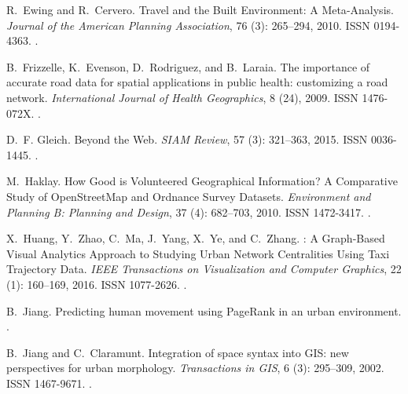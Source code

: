 \documentclass[Afour,sageh,times]{sagej}
\begin{document}
\begin{thebibliography}{54}
	R.~Ewing and R.~Cervero.
	\newblock Travel and the {Built} {Environment}: {A} {Meta}-{Analysis}.
	\newblock \emph{Journal of the American Planning Association}, 76
	(3): 265--294, 2010.
	\newblock ISSN 0194-4363.
	\newblock {}.
	
	B.~Frizzelle, K.~Evenson, D.~Rodriguez, and B.~Laraia.
	\newblock The importance of accurate road data for spatial applications in
	public health: customizing a road network.
	\newblock \emph{International Journal of Health Geographics}, 8 (24),
	2009.
	\newblock ISSN 1476-072X.
	\newblock {}.
	
	D.~F. Gleich.
	 {Beyond} the {Web}.
	\newblock \emph{SIAM Review}, 57 (3): 321--363, 2015.
	\newblock ISSN 0036-1445.
	\newblock {}.
	
	M.~Haklay.
	\newblock How {Good} is {Volunteered} {Geographical} {Information}? {A}
	{Comparative} {Study} of {OpenStreetMap} and {Ordnance} {Survey} {Datasets}.
	\newblock \emph{Environment and Planning B: Planning and Design}, 37
	(4): 682--703, 2010.
	\newblock ISSN 1472-3417.
	\newblock {}.
	
	X.~Huang, Y.~Zhao, C.~Ma, J.~Yang, X.~Ye, and C.~Zhang.
	: {A} {Graph}-{Based} {Visual} {Analytics} {Approach} to
	{Studying} {Urban} {Network} {Centralities} {Using} {Taxi} {Trajectory}
	{Data}.
	\newblock \emph{IEEE Transactions on Visualization and Computer Graphics},
	22 (1): 160--169, 2016.
	\newblock ISSN 1077-2626.
	\newblock {}.
	
	B.~Jiang.
	\newblock Predicting human movement using {PageRank} in an urban environment.
	.
	
	B.~Jiang and C.~Claramunt.
	\newblock Integration of space syntax into {GIS}: new perspectives for urban
	morphology.
	\newblock \emph{Transactions in GIS}, 6 (3): 295--309, 2002.
	\newblock ISSN 1467-9671.
	\newblock {}.
	

\end{thebibliography}
\end{document}
